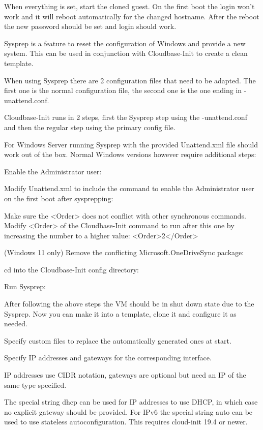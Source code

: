 When everything is set, start the cloned guest. On the first boot the login won’t work and it will reboot automatically for the changed hostname. After the reboot the new password should be set and login should work.

Sysprep is a feature to reset the configuration of Windows and provide a new system. This can be used in conjunction with Cloudbase-Init to create a clean template.

When using Sysprep there are 2 configuration files that need to be adapted. The first one is the normal configuration file, the second one is the one ending in -unattend.conf.

Cloudbase-Init runs in 2 steps, first the Sysprep step using the -unattend.conf and then the regular step using the primary config file.

For Windows Server running Sysprep with the provided Unattend.xml file should work out of the box. Normal Windows versions however require additional steps:

Enable the Administrator user:

Modify Unattend.xml to include the command to enable the Administrator user on the first boot after sysprepping:

Make sure the <Order> does not conflict with other synchronous commands. Modify <Order> of the Cloudbase-Init command to run after this one by increasing the number to a higher value: <Order>2</Order>

(Windows 11 only) Remove the conflicting Microsoft.OneDriveSync package:

cd into the Cloudbase-Init config directory:

Run Sysprep:

After following the above steps the VM should be in shut down state due to the Sysprep. Now you can make it into a template, clone it and configure it as needed.

Specify custom files to replace the automatically generated ones at start.

Specify IP addresses and gateways for the corresponding interface.

IP addresses use CIDR notation, gateways are optional but need an IP of the same type specified.

The special string dhcp can be used for IP addresses to use DHCP, in which case no explicit gateway should be provided. For IPv6 the special string auto can be used to use stateless autoconfiguration. This requires cloud-init 19.4 or newer.

